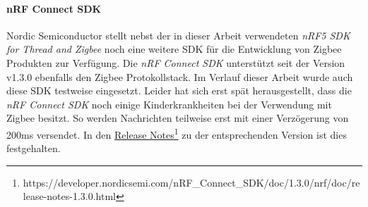 \paragraph{nRF Connect SDK}
Nordic Semiconductor stellt nebst der in dieser Arbeit verwendeten \textit{nRF5 SDK for Thread and Zigbee} noch eine weitere SDK für die Entwicklung von Zigbee Produkten zur Verfügung.
Die \textit{nRF Connect SDK} unterstützt seit der Version v1.3.0 ebenfalls den Zigbee Protokollstack.
Im Verlauf dieser Arbeit wurde auch diese SDK testweise eingesetzt.
Leider hat sich erst spät herausgestellt, dass die \textit{nRF Connect SDK} noch einige \glqq Kinderkrankheiten\grqq{} bei der Verwendung mit Zigbee besitzt.
So werden Nachrichten teilweise erst mit einer Verzögerung von 200ms versendet. In den \href{https://developer.nordicsemi.com/nRF_Connect_SDK/doc/1.3.0/nrf/doc/release-notes-1.3.0.html}{Release Notes\footnote{\url{https://developer.nordicsemi.com/nRF_Connect_SDK/doc/1.3.0/nrf/doc/release-notes-1.3.0.html}}} zu der entsprechenden Version ist dies festgehalten. 
